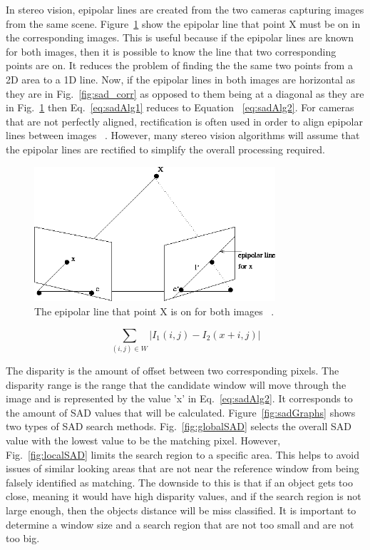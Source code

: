 In stereo vision, epipolar lines are created from the two cameras capturing images from the same scene. Figure~\ref{fig:epipolar} show the epipolar line that point X must be on in the corresponding images. This is useful because if the epipolar lines are known for both images, then it is possible to know the line that two corresponding points are on. It reduces the problem of finding the the same two points from a 2D area to a 1D line. Now, if the epipolar lines in both images are horizontal as they are in Fig.~\ref{fig:sad_corr} as opposed to them being at a diagonal as they are in Fig.~\ref{fig:epipolar} then Eq.~\ref{eq:sadAlg1} reduces to Equation ~\ref{eq:sadAlg2}. For cameras that are not perfectly aligned, rectification is often used in order to align epipolar lines between images ~\cite{rectification}. However, many stereo vision algorithms will assume that the epipolar lines are rectified to simplify the overall processing required.

\begin{figure}
\begin{center}
	\includegraphics[height=50mm]{figures/epipolar.png}
	\captionfonts
	\caption{The epipolar line that point X is on for both images ~\cite{epipolar}.}
	\label{fig:epipolar}
\end{center}
\end{figure}

\begin{equation}
	\sum\limits_{(i,j)\in W}\left| I_{1}(i,j)-I_{2}(x+i,j) \right|
	\label{eq:sadAlg2}
\end{equation}

The disparity is the amount of offset between two corresponding pixels. The disparity range is the range that the candidate window will move through the image and is represented by the value 'x' in Eq.~\ref{eq:sadAlg2}. It corresponds to the amount of SAD values that will be calculated. Figure~\ref{fig:sadGraphs} shows two types of SAD search methods. Fig.~\ref{fig:globalSAD} selects the overall SAD value with the lowest value to be the matching pixel. However, Fig.~\ref{fig:localSAD} limits the search region to a specific area. This helps to avoid issues of similar looking areas that are not near the reference window from being falsely identified as matching. The downside to this is that if an object gets too close, meaning it would have high disparity values, and if the search region is not large enough, then the objects distance will be miss classified. It is important to determine a window size and a search region that are not too small and are not too big.

